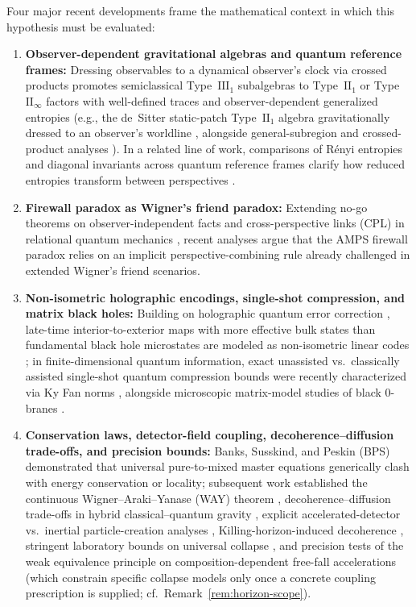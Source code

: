 \documentclass[11pt,a4paper]{article}
\theoremstyle{definition}
\theoremstyle{remark}
\newcommand{\1}{\mathbf{1}}
\begin{document}
Four major recent developments frame the mathematical context in which this hypothesis must be evaluated:
\begin{enumerate}
  \item \textbf{Observer-dependent gravitational algebras and quantum reference frames:} Dressing observables to a dynamical observer's clock via crossed products promotes semiclassical Type~$\mathrm{III}_1$ subalgebras to Type~$\mathrm{II}_1$ or Type~$\mathrm{II}_\infty$ factors with well-defined traces and observer-dependent generalized entropies (e.g., the de~Sitter static-patch Type~$\mathrm{II}_1$ algebra gravitationally dressed to an observer's worldline \cite{CLPW2023}, alongside general-subregion and crossed-product analyses \cite{CPW2023,JensenSorceSperanza2023,KudlerFlam2023,DeVuyst2024,DeVuyst2025}). In a related line of work, comparisons of R\'enyi entropies and diagonal invariants across quantum reference frames clarify how reduced entropies transform between perspectives \cite{delaHamette2026}.
  \item \textbf{Firewall paradox as Wigner's friend paradox:} Extending no-go theorems on observer-independent facts \cite{FrauchigerRenner2018,Bong2020} and cross-perspective links (CPL) in relational quantum mechanics \cite{Rovelli1996,AdlamRovelli2022}, recent analyses \cite{HausmannRenner2025,Walleghem2025,Adlam2026} argue that the AMPS firewall paradox relies on an implicit perspective-combining rule already challenged in extended Wigner's friend scenarios.
  \item \textbf{Non-isometric holographic encodings, single-shot compression, and matrix black holes:} Building on holographic quantum error correction \cite{AlmheiriDongHarlow2015}, late-time interior-to-exterior maps with more effective bulk states than fundamental black hole microstates are modeled as non-isometric linear codes \cite{Akers2022}; in finite-dimensional quantum information, exact unassisted vs.\ classically assisted single-shot quantum compression bounds were recently characterized via Ky Fan norms \cite{FarberGour2026}, alongside microscopic matrix-model studies of black 0-branes \cite{BFSS1997,IKKT1997,Choudhury2024}.
  \item \textbf{Conservation laws, detector-field coupling, decoherence--diffusion trade-offs, and precision bounds:} Banks, Susskind, and Peskin (BPS) \cite{BPS1984} demonstrated that universal pure-to-mixed master equations generically clash with energy conservation or locality; subsequent work established the continuous Wigner--Araki--Yanase (WAY) theorem \cite{KuramochiTajima2023}, decoherence--diffusion trade-offs in hybrid classical--quantum gravity \cite{Oppenheim2023PRX,Oppenheim2023NC,TilloyDiosi2016,Stamp2015}, explicit accelerated-detector vs.\ inertial particle-creation analyses \cite{UnruhWald1984}, Killing-horizon-induced decoherence \cite{DSW2023}, stringent laboratory bounds on universal collapse \cite{Donadi2021,Pedalino2025}, and precision tests of the weak equivalence principle on composition-dependent free-fall accelerations \cite{MICROSCOPE2022} (which constrain specific collapse models only once a concrete coupling prescription is supplied; cf.\ Remark~\ref{rem:horizon-scope}).
\end{enumerate}
\end{document}
